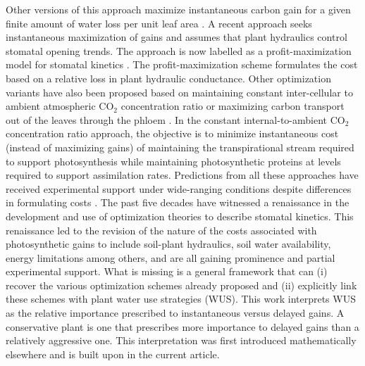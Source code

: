 \documentclass[utf8]{frontiersSCNS} %
\begin{document}
Other versions of this approach maximize instantaneous carbon gain for a given finite amount of water loss per unit leaf area \citep{katul_leaf_2009}.  A recent approach seeks instantaneous maximization of gains and assumes that plant hydraulics control stomatal opening trends.  The approach is now labelled as a profit-maximization model for stomatal kinetics \citep{sperry_pragmatic_2016,sperry_predicting_2017}. The profit-maximization scheme formulates the cost based on a relative loss in plant hydraulic conductance.  Other optimization variants have also been proposed based on maintaining constant inter-cellular to ambient atmospheric CO$_2$ concentration ratio \citep{prentice2014balancing} or maximizing carbon transport out of the leaves through the phloem \citep{nikinmaa_assimilate_2013}.  In the constant internal-to-ambient CO$_2$ concentration ratio approach, the objective is to minimize instantaneous cost (instead of maximizing gains) of maintaining the transpirational stream required to support photosynthesis while maintaining photosynthetic proteins at levels required to support assimilation rates.  Predictions from all these approaches have received experimental support under wide-ranging conditions despite differences in formulating costs  \citep{nikinmaa_assimilate_2013,prentice2014balancing,sperry_predicting_2017}.
The past five decades have witnessed a renaissance in the development and use of optimization theories to describe stomatal kinetics. This renaissance led to the revision of the nature of the costs associated with photosynthetic gains to include soil-plant hydraulics, soil water availability, energy limitations \citep{roth2018fossil} among others, and are all gaining prominence and partial experimental support. What is missing is a general framework that can (i) recover the various optimization schemes already proposed and (ii) explicitly link these schemes with plant water use strategies (WUS). This work interprets WUS as the relative importance prescribed to instantaneous versus delayed gains. A conservative plant is one that prescribes more importance to delayed gains than a relatively aggressive one. This interpretation was first introduced mathematically elsewhere \citep{manzoni_optimization_2013} and is built upon in the current article.
\end{document}
